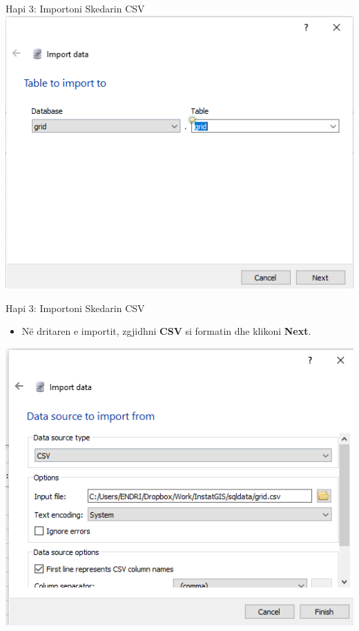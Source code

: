 \documentclass[
  ignorenonframetext,
]{beamer}
\providecommand{\tightlist}{%
  \setlength{\itemsep}{0pt}\setlength{\parskip}{0pt}}
\begin{document}
\begin{frame}{Hapi 3: Importoni Skedarin CSV}
\label{hapi-3-importoni-skedarin-csv-1}
\includegraphics{./Figs/sql11.png}
\end{frame}

\begin{frame}{Hapi 3: Importoni Skedarin CSV}
\label{hapi-3-importoni-skedarin-csv-2}
\begin{itemize}
\tightlist
\item
  Në dritaren e importit, zgjidhni \textbf{CSV} si formatin dhe klikoni
  \textbf{Next}.
\end{itemize}

\includegraphics{./Figs/sql12.png}
\end{frame}
\end{document}
